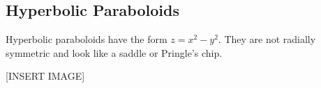 \subsection{Hyperbolic Paraboloids}
\noindent
Hyperbolic paraboloids have the form $z=x^2-y^2$. They are not radially symmetric and look like a saddle or Pringle's chip.

[INSERT IMAGE]
